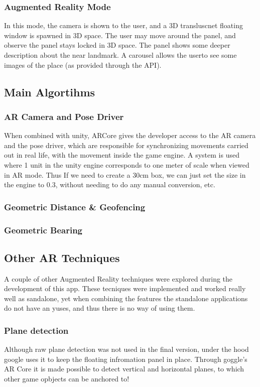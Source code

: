 \subsubsection{Augmented Reality Mode}
In this mode, the camera is shown to the user, and a 3D transluscnet floating window is spawned in 3D space.
The user may move around the panel, and observe the panel stays locked in 3D space. The panel shows
some deeper description about the near landmark. A carousel allows the userto see some images of the place
 (as provided through the API).  


\subsection{Main Algortihms}
\subsubsection{AR Camera and Pose Driver}
When combined with unity, ARCore gives the developer access to the AR camera and the pose driver, which are responsible for synchronizing movements 
carried out in real life, with the movement inside the game engine. A system is used where 1 unit in the unity engine corresponds to one meter of scale when 
viewed in AR mode. Thus If we need to create a 30cm box, we can just set the size in the engine to 0.3, without needing to do any manual conversion, etc.
\subsubsection{Geometric Distance \& Geofencing}
\subsubsection{Geometric Bearing}


 \subsection{Other AR Techniques}
 A couple of other Augmented Reality techniques were explored during the development of this app. 
 These tecniques were implemented and worked really well as sandalone, yet when combining the features 
 the standalone applications do not have an yuses, and thus there is no way of using them. 
 \subsubsection{Plane detection}
 Although raw plane detection was not used in the final version, under the hood google uses it to keep the 
 floating infromation panel in place. Through goggle's AR Core it is made possible to detect vertical 
 and horizontal planes, to which other game opbjects can be anchored to!\\

